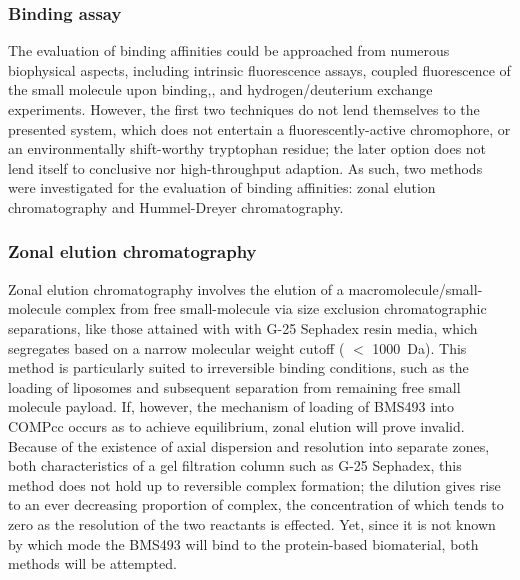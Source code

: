 \begin{refsection}
\subsubsection{Binding assay}

The evaluation of binding affinities could be approached from numerous
biophysical aspects, including intrinsic fluorescence assays,\cite{Kunwar2006}
coupled fluorescence of the small molecule upon binding,\cite{Barik2003}, and
hydrogen/deuterium exchange experiments.\cite{Erba2011} However, the first two
techniques do not lend themselves to the presented system, which does not
entertain a fluorescently-active chromophore, or an environmentally shift-worthy
tryptophan residue; the later option does not lend itself to conclusive nor
high-throughput adaption. As such, two methods were investigated for the
evaluation of binding affinities: zonal elution chromatography and Hummel-Dreyer
chromatography.

\subsubsection{Zonal elution chromatography}

Zonal elution chromatography involves the elution of a
macromolecule/small-molecule complex from free small-molecule via size exclusion
chromatographic separations, like those attained with with G-25 Sephadex resin
media, which segregates based on a narrow molecular weight cutoff ( ${<}$
\SI{1000}{\dalton}).\cite{Hummel1962} This method is particularly suited to irreversible binding
conditions, such as the loading of liposomes and subsequent separation from
remaining free small molecule payload.\cite{Pan2012,Wang2013} If, however, the
mechanism of loading of BMS493 into COMPcc occurs as to achieve equilibrium,
zonal elution will prove invalid. Because of the existence of axial dispersion
and resolution into separate zones, both characteristics of a gel filtration
column such as G-25 Sephadex, this method does not hold up to reversible complex
formation; the dilution gives rise to an ever decreasing proportion of complex,
the concentration of which tends to zero as the resolution of the two
reactants is effected.\cite{Winzor2001} Yet, since it is not known by which mode
the BMS493 will bind to the protein-based biomaterial, both methods will be
attempted.


\end{refsection}
